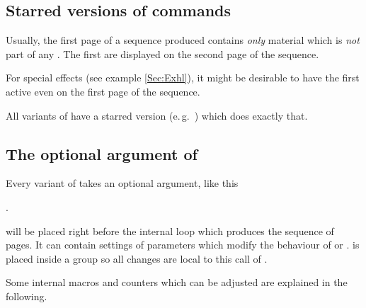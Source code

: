 \begin{slide}
  \newslide

  \subsection{Starred versions of  commands}\label{Sec:StarredStepwise}%
  Usually, the first page of a sequence produced contains \emph{only} material which is \emph{not} part of any
  . The first  are displayed on the second page of the sequence.

  For special effects (see example \ref{Sec:Exhl}), it might be desirable to have the first  active
  even on the first page of the sequence.

  All variants of   have a starred version (e.\,g.\ ) which does exactly that.

  \newslide

  \subsection{The optional argument of }%
  Every variant of  takes an optional argument, like this
  \begin{center}
    .
  \end{center}
   will be placed right before the internal loop which produces the sequence of pages.  It can
  contain settings of parameters which modify the behaviour of  or . 
  is placed inside a group so all changes are local to this call of .

  Some internal macros and counters which can be adjusted are explained in the following.

  \newslide


\end{slide}
